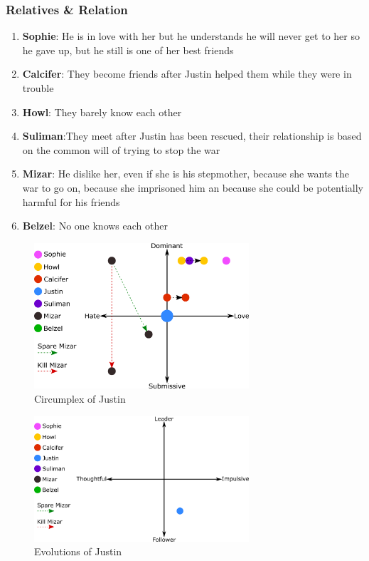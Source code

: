 \subsubsection*{Relatives \& Relation}
\begin{enumerate}
\item \textbf{Sophie}: He is in love with her but he understands he will never get to her so he gave up, but he still is one of her best friends
\item \textbf{Calcifer}: They become friends after Justin helped them while they were in trouble
\item \textbf{Howl}: They barely know each other
\item \textbf{Suliman}:They meet after Justin has been rescued, their relationship is based on the common will of trying to stop the war
             
\item \textbf{Mizar}: He dislike her, even if she is his stepmother, because she wants the war to go on, because she imprisoned him an because she could be potentially harmful for his friends
\item \textbf{Belzel}: No one knows each other
\end{enumerate}

\begin{figure}[H]
  \centering
  \includegraphics[width=8cm]{Images/SVG/Exported/Circumplexes/justinCircumplex}
  \caption{Circumplex of Justin}
\end{figure}

\begin{figure}[H]
  \centering
   \includegraphics[width=8cm]{Images/SVG/Exported/Evolutions/justinEvolution}
  \caption{Evolutions of Justin}
\end{figure}

